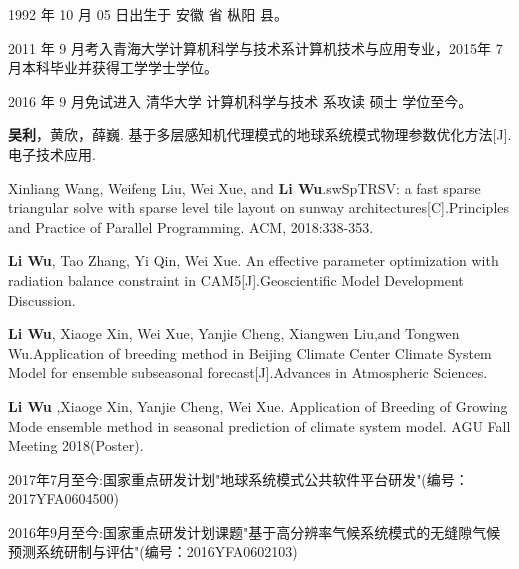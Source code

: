 \begin{resume}


  1992 年 10 月 05 日出生于 安徽 省 枞阳 县。

  2011 年 9 月考入青海大学计算机科学与技术系计算机技术与应用专业，2015年 7 月本科毕业并获得工学学士学位。

  2016 年 9 月免试进入 清华大学 计算机科学与技术 系攻读 硕士 学位至今。


  \begin{publications}
    \item \textbf{吴利}，黄欣，薛巍. 基于多层感知机代理模式的地球系统模式物理参数优化方法[J].电子技术应用.
    \item Xinliang Wang, Weifeng Liu, Wei Xue, and \textbf{Li Wu}.swSpTRSV: a fast sparse triangular solve with sparse level tile layout on sunway architectures[C].Principles and Practice of Parallel Programming. ACM, 2018:338-353.
  \end{publications}
  

  \begin{publications}
    \item \textbf{Li Wu}, Tao Zhang, Yi Qin, Wei Xue. An effective parameter optimization with radiation balance constraint in CAM5[J].Geoscientific Model Development Discussion.
    \item \textbf{Li Wu}, Xiaoge Xin, Wei Xue, Yanjie Cheng, Xiangwen Liu,and Tongwen Wu.Application of breeding method in Beijing Climate Center Climate System Model for ensemble subseasonal forecast[J].Advances in Atmospheric Sciences.
  \end{publications}


  \begin{publications}
    \item \textbf{Li Wu} ,Xiaoge Xin, Yanjie Cheng, Wei Xue. Application of Breeding of Growing Mode ensemble method in seasonal prediction of climate system model. AGU Fall Meeting 2018(Poster).
  \end{publications}
  
  \begin{publications}
    \item 2017年7月至今:国家重点研发计划"地球系统模式公共软件平台研发"(编号：2017YFA0604500) 
    \item 2016年9月至今:国家重点研发计划课题"基于高分辨率气候系统模式的无缝隙气候预测系统研制与评估"(编号：2016YFA0602103)
  \end{publications}
  

\end{resume}
